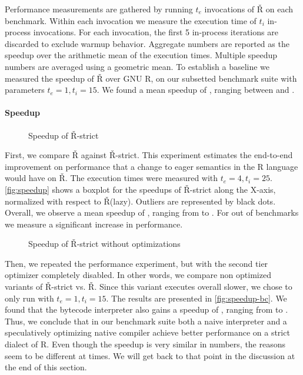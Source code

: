 \documentclass[review,creen,acmsmall]{acmart}
\renewcommand{\Rsh}{{\sf\v R}\xspace}
\newcommand{\Rshstrict}{{\sf\v R-strict}\xspace}
\begin{document}
Performance measurements are gathered by running $t_e$ invocations of \Rsh on
each benchmark. Within each invocation we measure the execution time of $t_i$
in-process invocations. For each invocation, the first 5 in-process iterations
are discarded to exclude warmup behavior. Aggregate numbers are reported as the
speedup over the arithmetic mean of the execution times. Multiple speedup
numbers are averaged using a geometric mean. To establish a baseline we measured
the speedup of \Rsh over GNU R, on our subsetted benchmark suite with parameters
$t_e = 1, t_i = 15$. We found a mean speedup of \speedupRsh, ranging between
\speedupRshMin and \speedupRshMax.

\paragraph{Speedup}

\begin{figure}[h]
  \centering
  
  \caption{Speedup of \Rshstrict}
  \label{fig:speedup}
\end{figure}

First, we compare \Rsh against \Rshstrict. This experiment estimates the end-to-end
improvement on performance that a change to eager semantics in the R language
would have on \Rsh. The execution times were measured with $t_e = 4, t_i = 25$.
\autoref{fig:speedup} shows a boxplot for the speedups of \Rshstrict along the X-axis,
normalized with respect to \Rsh (lazy). Outliers are represented by black dots. Overall, we observe a mean speedup of
\speedupRshStrict, ranging from \speedupRshStrictMin to \speedupRshStrictMax.
For \speedupRshStrictSignificant out of \benchmarkSuiteSize benchmarks we measure a significant increase in performance.
%
\begin{figure}[h]
  \centering
  
  \caption{Speedup of \Rshstrict without optimizations}
  \label{fig:speedup-bc}
\end{figure}
%

Then, we repeated the performance experiment, but with the second tier
optimizer completely disabled. In other words, we compare non optimized variants of \Rshstrict vs. \Rsh.
Since this variant executes overall \rshBCSlowdown slower, we chose to only run with $t_e = 1, t_i = 15$.
The results are presented in \autoref{fig:speedup-bc}. We found that the bytecode
interpreter also gains a speedup of \speedupBCRshStrict, ranging from
\speedupBCRshStrictMin to \speedupBCRshStrictMax.
%
Thus, we conclude that in our benchmark suite both a naive interpreter and a speculatively
optimizing native compiler achieve better performance on a strict dialect of R.
Even though the speedup is very similar in numbers, the reasons seem to be
different at times. We will get back to that point in the discussion at the end of
this section.
\end{document}
